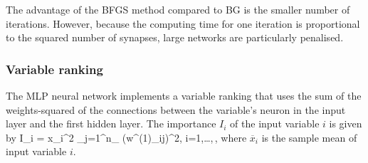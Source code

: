 The advantage of the BFGS method compared to BG is the smaller number of 
iterations. However, because the computing time for one iteration is 
proportional to the squared number of synapses, large networks are 
particularly penalised.

\subsubsection{Variable ranking}
\label{sec:ann:ranking}

The MLP neural network implements a variable ranking that uses the sum of the 
weights-squared of the connections between the variable's neuron in the input 
layer and the first hidden layer. The importance $I_i$ of the input variable 
$i$ is given by
\beq
  \label{eq:mlp:ranking}
  I_i = \overline x_i^2 \sum_{j=1}^{n_} \left(w^{(1)}_{ij}\right)^2, \qquad i=1,\dots,\Nvar\,,
\eeq
where $\overline x_{i}$ is the sample mean of input variable $i$.

